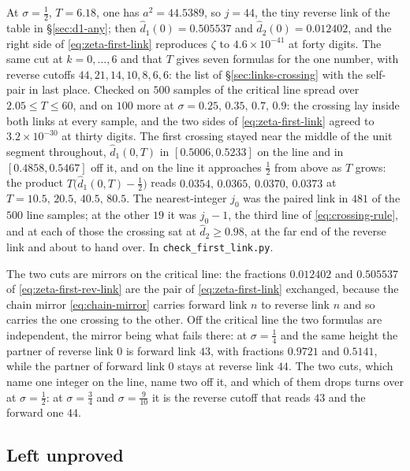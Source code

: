 \documentclass[11pt]{article}
\theoremstyle{definition}
\begin{document}
At $\sigma=\tfrac12$, $T=6.18$, one has $a^{2}=44.5389$, so $j=44$, the tiny
reverse link of the table in \S\ref{sec:d1-any}; then
$\hat d_1(0)=0.505537$ and $\hat d_2(0)=0.012402$, and the right side of
\eqref{eq:zeta-first-link} reproduces $\zeta$ to $4.6\times10^{-41}$ at forty
digits. The same cut at $k=0,\dots,6$ and that $T$ gives seven formulas for the
one number, with reverse cutoffs $44,21,14,10,8,6,6$: the list of
\S\ref{sec:links-crossing} with the self-pair in last place. Checked on $500$
samples of the critical line spread over $2.05\le T\le60$, and on $100$ more at
$\sigma=0.25,\,0.35,\,0.7,\,0.9$: the crossing lay inside both links at every
sample, and the two sides of \eqref{eq:zeta-first-link} agreed to
$3.2\times10^{-30}$ at thirty digits. The first crossing stayed near the middle
of the unit segment throughout, $\hat d_1(0,T)$ in $[0.5006,0.5233]$ on the line
and in $[0.4858,0.5467]$ off it, and on the line it approaches $\tfrac12$ from
above as $T$ grows: the product $T\bigl(\hat d_1(0,T)-\tfrac12\bigr)$ reads
$0.0354,\,0.0365,\,0.0370,\,0.0373$ at $T=10.5,\,20.5,\,40.5,\,80.5$. The
nearest-integer $j_0$ was the paired link in $481$ of the $500$ line samples;
at the other $19$ it was $j_0-1$, the third line of \eqref{eq:crossing-rule},
and at each of those the crossing sat at $\hat d_2\ge0.98$, at the far end of
the reverse link and about to hand over. In \texttt{check\_first\_link.py}.

The two cuts are mirrors on the critical line: the fractions $0.012402$ and
$0.505537$ of \eqref{eq:zeta-first-rev-link} are the pair of
\eqref{eq:zeta-first-link} exchanged, because the chain mirror
\eqref{eq:chain-mirror} carries forward link $n$ to reverse link $n$ and so
carries the one crossing to the other. Off the critical line the two formulas
are independent, the mirror being what fails there: at $\sigma=\tfrac14$ and
the same height the partner of reverse link $0$ is forward link $43$, with
fractions $0.9721$ and $0.5141$, while the partner of forward link $0$ stays
at reverse link $44$. The two cuts, which name one integer on the line, name
two off it, and which of them drops turns over at $\sigma=\tfrac12$: at
$\sigma=\tfrac34$ and $\sigma=\tfrac9{10}$ it is the reverse cutoff that reads
$43$ and the forward one $44$.

\subsection{Left unproved}\label{sec:unproved}
\end{document}
